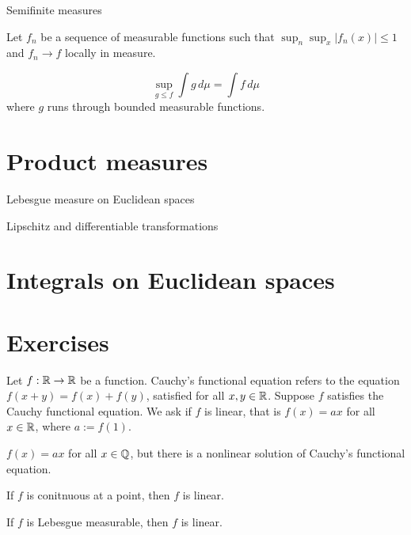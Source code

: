 \documentclass{../../large}
\begin{document}
\begin{prb}
\end{prb}

\begin{prb}
Semifinite measures

Let $f_n$ be a sequence of measurable functions such that $\sup_n\sup_x|f_n(x)|\le1$ and $f_n\to f$ locally in measure.
\begin{parts}
\item
\[\sup_{g\le f}\int g\,d\mu=\int f\,d\mu\]
where $g$ runs through bounded measurable functions.
\item
\end{parts}
\end{prb}


\section{Product measures}

\begin{prb}
Lebesgue measure on Euclidean spaces
\end{prb}


Lipschitz and differentiable transformations



\section{Integrals on Euclidean spaces}




\section*{Exercises}
\begin{prb}
Let $f:\mathbb{R}\to\mathbb{R}$ be a function.
Cauchy's functional equation refers to the equation $f(x+y)=f(x)+f(y)$, satisfied for all $x,y\in\mathbb{R}$.
Suppose $f$ satisfies the Cauchy functional equation.
We ask if $f$ is linear, that is $f(x)=ax$ for all $x\in\mathbb{R}$, where $a:=f(1)$.
\begin{parts}
\item $f(x)=ax$ for all $x\in\mathbb{Q}$, but there is a nonlinear solution of Cauchy's functional equation.
\item If $f$ is conitnuous at a point, then $f$ is linear.
\item If $f$ is Lebesgue measurable, then $f$ is linear.
\end{parts}
\end{prb}
\end{document}
